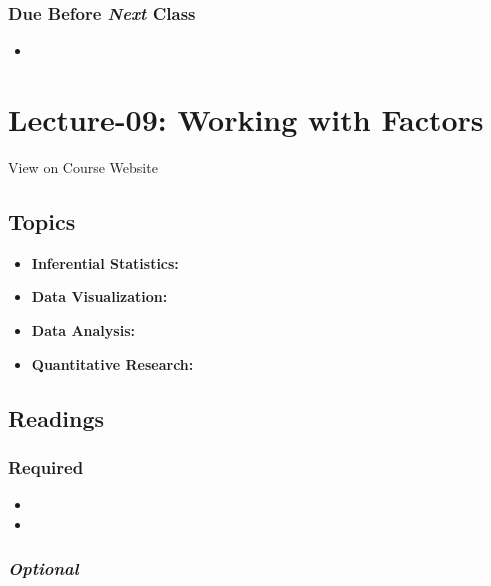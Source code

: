 \documentclass[]{book}
\providecommand{\tightlist}{%
  \setlength{\itemsep}{0pt}\setlength{\parskip}{0pt}}
\theoremstyle{definition}
\theoremstyle{definition}
\theoremstyle{definition}
\theoremstyle{remark}
\begin{document}
\subsubsection*{\texorpdfstring{Due Before \emph{Next}
Class}{Due Before Next Class}}\label{due-before-next-class-8}

\begin{itemize}
\item
\end{itemize}

\section{Lecture-09: Working with
Factors}\label{lecture-09-working-with-factors}

View on Course Website

\subsection*{Topics}\label{topics-9}

\begin{itemize}
\tightlist
\item
  \textbf{Inferential Statistics:}
\item
  \textbf{Data Visualization:}
\item
  \textbf{Data Analysis:}
\item
  \textbf{Quantitative Research:}
\end{itemize}

\subsection*{Readings}\label{readings-10}

\subsubsection*{Required}\label{required-9}

\begin{itemize}
\item
\item
\end{itemize}

\subsubsection*{\texorpdfstring{\emph{Optional}}{Optional}}\label{optional-9}
\end{document}
